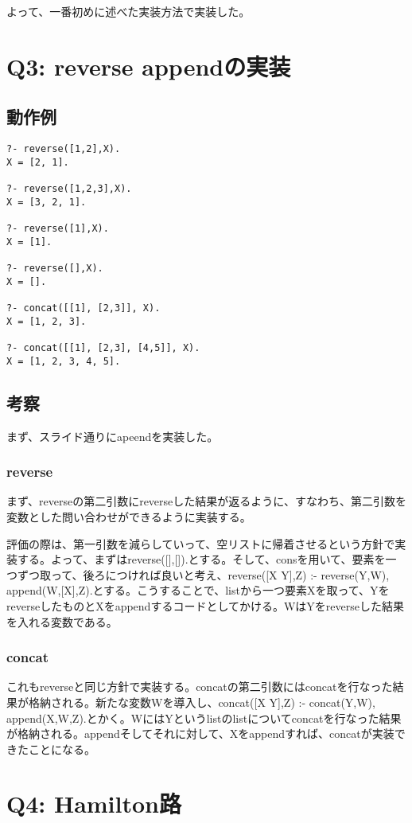 \documentclass[uplatex,12pt]{jsarticle}
\begin{document}
よって、一番初めに述べた実装方法で実装した。


\section{Q3: reverse appendの実装}
\subsection{動作例}
\begin{lstlisting}[caption=動作例]
?- reverse([1,2],X).
X = [2, 1].

?- reverse([1,2,3],X).
X = [3, 2, 1].

?- reverse([1],X).
X = [1].

?- reverse([],X).
X = [].

?- concat([[1], [2,3]], X).
X = [1, 2, 3].

?- concat([[1], [2,3], [4,5]], X).
X = [1, 2, 3, 4, 5].
\end{lstlisting}
\subsection{考察}
まず、スライド通りにapeendを実装した。

\subsubsection{reverse}
まず、reverseの第二引数にreverseした結果が返るように、すなわち、第二引数を変数とした問い合わせができるように実装する。

評価の際は、第一引数を減らしていって、空リストに帰着させるという方針で実装する。よって、まずはreverse([],[]).とする。そして、consを用いて、要素を一つずつ取って、後ろにつければ良いと考え、reverse([X \mid Y],Z) :- reverse(Y,W), append(W,[X],Z).とする。こうすることで、listから一つ要素Xを取って、YをreverseしたものとXをappendするコードとしてかける。WはYをreverseした結果を入れる変数である。

\subsubsection{concat}
これもreverseと同じ方針で実装する。concatの第二引数にはconcatを行なった結果が格納される。新たな変数Wを導入し、concat([X \mid Y],Z) :- concat(Y,W), append(X,W,Z).とかく。WにはYというlistのlistについてconcatを行なった結果が格納される。appendそしてそれに対して、Xをappendすれば、concatが実装できたことになる。

\section{Q4: Hamilton路}
\end{document}
